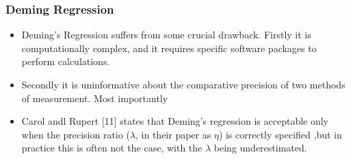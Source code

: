 \documentclass[compress]{beamer}        %
\begin{document}
\begin{frame}

\frametitle{Deming Regression}
\large
\begin{itemize}
\item Deming's Regression suffers from some crucial drawback. Firstly it
is computationally complex, and it requires specific software
packages to perform calculations.\item Secondly it is uninformative
about the comparative precision of two methods of measurement.
Most importantly \item Carol andl Rupert [11] states that Deming's
regression is acceptable only when the precision ratio ($\lambda$,
in their paper as $\eta$) is correctly specified ,but in practice
this is often not the case, with the $\lambda$ being
underestimated.
\end{itemize}
\end{frame}
\end{document}
